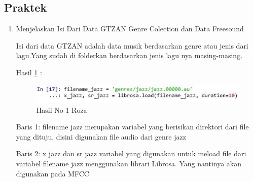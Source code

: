\subsection{Praktek}
\begin{enumerate}
\item Menjelaskan Isi Dari Data GTZAN Genre Colection dan Data Freesound
\begin{itemize}
\par Isi dari data GTZAN adalah data musik berdasarkan genre atau jenis dari lagu.Yang sudah di folderkan berdasarkan jenis lagu nya masing-masing.

\par Hasil \ref{no1roza} :
\begin{figure}[!hbtp]
\centering
\includegraphics[scale=0.7]{figures/no1roza.jpg}
\caption{Hasil No 1 Roza}
\label{no1roza}
\end{figure}
\par Baris 1: filename jazz merupakan variabel yang berisikan direktori dari file yang dituju, disini digunakan file audio dari genre jazz
\par Baris 2: x jazz dan sr jazz variabel yang digunakan untuk meload file dari variabel filename jazz menggunakan librari Librosa. Yang nantinya akan digunakan pada MFCC
\end{itemize}
\par


\end{enumerate}
